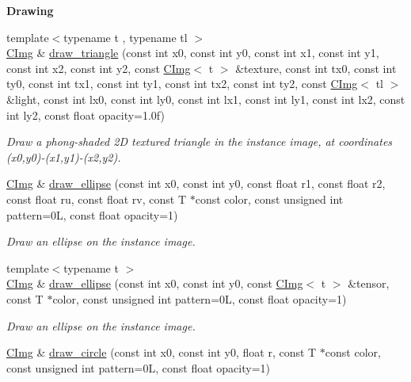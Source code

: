 \begin{Indent}{\bf Drawing}
\begin{DoxyCompactItemize}
{\footnotesize template$<$typename t , typename tl $>$ }\\\hyperlink{structcimg__library_1_1_c_img}{CImg} \& \hyperlink{structcimg__library_1_1_c_img_ae6ead0c887f410aca40d8654507ff94c}{draw\_\-triangle} (const int x0, const int y0, const int x1, const int y1, const int x2, const int y2, const \hyperlink{structcimg__library_1_1_c_img}{CImg}$<$ t $>$ \&texture, const int tx0, const int ty0, const int tx1, const int ty1, const int tx2, const int ty2, const \hyperlink{structcimg__library_1_1_c_img}{CImg}$<$ tl $>$ \&light, const int lx0, const int ly0, const int lx1, const int ly1, const int lx2, const int ly2, const float opacity=1.0f)
\begin{DoxyCompactList}\small\item\em Draw a phong-\/shaded 2D textured triangle in the instance image, at coordinates ({\ttfamily x0},{\ttfamily y0})-\/({\ttfamily x1},{\ttfamily y1})-\/({\ttfamily x2},{\ttfamily y2}). \item\end{DoxyCompactList}\item 
\hyperlink{structcimg__library_1_1_c_img}{CImg} \& \hyperlink{structcimg__library_1_1_c_img_a20cc568a4d3bfeb07ac5a7b41a9f1235}{draw\_\-ellipse} (const int x0, const int y0, const float r1, const float r2, const float ru, const float rv, const T $\ast$const color, const unsigned int pattern=0L, const float opacity=1)
\begin{DoxyCompactList}\small\item\em Draw an ellipse on the instance image. \item\end{DoxyCompactList}\item 
{\footnotesize template$<$typename t $>$ }\\\hyperlink{structcimg__library_1_1_c_img}{CImg} \& \hyperlink{structcimg__library_1_1_c_img_a9bdadaec2151f63786c2dd43236a86d3}{draw\_\-ellipse} (const int x0, const int y0, const \hyperlink{structcimg__library_1_1_c_img}{CImg}$<$ t $>$ \&tensor, const T $\ast$color, const unsigned int pattern=0L, const float opacity=1)
\begin{DoxyCompactList}\small\item\em Draw an ellipse on the instance image. \item\end{DoxyCompactList}\item 
\hyperlink{structcimg__library_1_1_c_img}{CImg} \& \hyperlink{structcimg__library_1_1_c_img_a64f2654380af28cac421ec5c7b9b2605}{draw\_\-circle} (const int x0, const int y0, float r, const T $\ast$const color, const unsigned int pattern=0L, const float opacity=1)

\end{DoxyCompactItemize}
\end{Indent}

